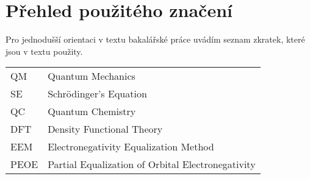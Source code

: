 \chapter*{Přehled použitého značení}

Pro jednodušší orientaci v textu bakalářské práce uvádím seznam zkratek, které jsou v textu použity.
\begin{flushleft}
\begin{longtable}[l]{ll} %
  QM                 & Quantum Mechanics
  \\[1mm]
  SE                 & Schrödinger's Equation
  \\[1mm]
  QC                 & Quantum Chemistry
  \\[1mm]
  DFT                & Density Functional Theory
  \\[1mm]
  EEM                 & Electronegativity Equalization Method
  \\[1mm]
  PEOE                 & Partial Equalization of Orbital Electronegativity
  \\[1mm]

\end{longtable}
\end{flushleft}
